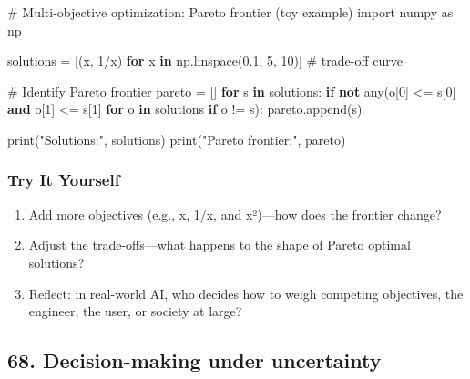 \documentclass[
  letterpaper,
  DIV=11,
  numbers=noendperiod]{scrreprt}
\newenvironment{Shaded}{\begin{snugshade}}{\end{snugshade}}
\newcommand{\BuiltInTok}[1]{\textcolor[rgb]{0.00,0.23,0.31}{#1}}
\newcommand{\CommentTok}[1]{\textcolor[rgb]{0.37,0.37,0.37}{#1}}
\newcommand{\ControlFlowTok}[1]{\textcolor[rgb]{0.00,0.23,0.31}{\textbf{#1}}}
\newcommand{\DecValTok}[1]{\textcolor[rgb]{0.68,0.00,0.00}{#1}}
\newcommand{\FloatTok}[1]{\textcolor[rgb]{0.68,0.00,0.00}{#1}}
\newcommand{\ImportTok}[1]{\textcolor[rgb]{0.00,0.46,0.62}{#1}}
\newcommand{\KeywordTok}[1]{\textcolor[rgb]{0.00,0.23,0.31}{\textbf{#1}}}
\newcommand{\NormalTok}[1]{\textcolor[rgb]{0.00,0.23,0.31}{#1}}
\newcommand{\OperatorTok}[1]{\textcolor[rgb]{0.37,0.37,0.37}{#1}}
\newcommand{\StringTok}[1]{\textcolor[rgb]{0.13,0.47,0.30}{#1}}
\providecommand{\tightlist}{%
  \setlength{\itemsep}{0pt}\setlength{\parskip}{0pt}}
\begin{document}
\begin{Shaded}
\begin{Highlighting}[]
\CommentTok{\# Multi{-}objective optimization: Pareto frontier (toy example)}
\ImportTok{import}\NormalTok{ numpy }\ImportTok{as}\NormalTok{ np}

\NormalTok{solutions }\OperatorTok{=}\NormalTok{ [(x, }\DecValTok{1}\OperatorTok{/}\NormalTok{x) }\ControlFlowTok{for}\NormalTok{ x }\KeywordTok{in}\NormalTok{ np.linspace(}\FloatTok{0.1}\NormalTok{, }\DecValTok{5}\NormalTok{, }\DecValTok{10}\NormalTok{)]  }\CommentTok{\# trade{-}off curve}

\CommentTok{\# Identify Pareto frontier}
\NormalTok{pareto }\OperatorTok{=}\NormalTok{ []}
\ControlFlowTok{for}\NormalTok{ s }\KeywordTok{in}\NormalTok{ solutions:}
    \ControlFlowTok{if} \KeywordTok{not} \BuiltInTok{any}\NormalTok{(o[}\DecValTok{0}\NormalTok{] }\OperatorTok{\textless{}=}\NormalTok{ s[}\DecValTok{0}\NormalTok{] }\KeywordTok{and}\NormalTok{ o[}\DecValTok{1}\NormalTok{] }\OperatorTok{\textless{}=}\NormalTok{ s[}\DecValTok{1}\NormalTok{] }\ControlFlowTok{for}\NormalTok{ o }\KeywordTok{in}\NormalTok{ solutions }\ControlFlowTok{if}\NormalTok{ o }\OperatorTok{!=}\NormalTok{ s):}
\NormalTok{        pareto.append(s)}

\BuiltInTok{print}\NormalTok{(}\StringTok{"Solutions:"}\NormalTok{, solutions)}
\BuiltInTok{print}\NormalTok{(}\StringTok{"Pareto frontier:"}\NormalTok{, pareto)}
\end{Highlighting}
\end{Shaded}

\subsubsection{Try It Yourself}\label{try-it-yourself-66}

\begin{enumerate}
\def\labelenumi{\arabic{enumi}.}
\tightlist
\item
  Add more objectives (e.g., x, 1/x, and x²)---how does the frontier
  change?
\item
  Adjust the trade-offs---what happens to the shape of Pareto optimal
  solutions?
\item
  Reflect: in real-world AI, who decides how to weigh competing
  objectives, the engineer, the user, or society at large?
\end{enumerate}

\subsection{68. Decision-making under
uncertainty}\label{decision-making-under-uncertainty}
\end{document}
